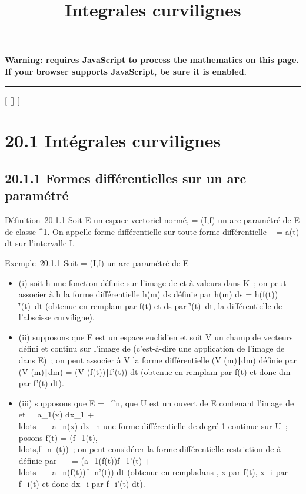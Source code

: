 \documentclass[]{article}
\title{Integrales curvilignes}
\author{}
\date{}
\begin{document}
\maketitle

\textbf{Warning: 
requires JavaScript to process the mathematics on this page.\\ If your
browser supports JavaScript, be sure it is enabled.}

\begin{center}\rule{3in}{0.4pt}\end{center}

[
[]
[

\section{20.1 Intégrales curvilignes}

\subsection{20.1.1 Formes différentielles sur un arc paramétré}

Définition~20.1.1 Soit E un espace vectoriel normé, \Gamma = (I,f) un arc
paramétré de E de classe ^1. On appelle forme différentielle
sur \Gamma toute forme différentielle \alpha~ = a(t) dt sur l'intervalle I.

Exemple~20.1.1 Soit \Gamma = (I,f) un arc paramétré de E

\begin{itemize}
\itemsep1pt\parskip0pt
\item
  (i) soit h une fonction définie sur l'image de \Gamma et à valeurs dans K~;
  on peut associer à h la forme différentielle h(m) ds définie par h(m)
  ds = h(f(t)) \f'(t)\
  dt (obtenue en rempla\ccant m par f(t) et ds par
  \f'(t)\ dt, la
  différentielle de l'abscisse curviligne).
\item
  (ii) supposons que E est un espace euclidien et soit V un champ de
  vecteurs défini et continu sur l'image de \Gamma (c'est-à-dire une
  application de l'image de \Gamma dans E)~; on peut associer à V la forme
  différentielle (V (m)∣dm) définie par (V
  (m)∣dm) = \left (V
  (f(t))∣f'(t)\right ) dt
  (obtenue en rempla\ccant m par f(t) et donc dm par
  f'(t) dt).
\item
  (iii) supposons que E = ~^n, que U est un ouvert de E
  contenant l'image de \Gamma et \omega = a_1(x) dx_1 +
  \\ldots~ +
  a_n(x) dx_n une forme différentielle de degré 1
  continue sur U~; posons f(t) =
  (f_1(t),\\ldots,f_n~(t))~;
  on peut considérer la forme différentielle restriction de \omega à \Gamma
  définie par \omega__\Gamma = \left
  (a_1(f(t))f_1'(t) +
  \\ldots~ +
  a_n(f(t))f_n'(t)\right ) dt (obtenue
  en rempla\ccant dans \omega, x par f(t), x_i
  par f_i(t) et donc dx_i par f_i'(t) dt).
\end{itemize}
\end{document}
